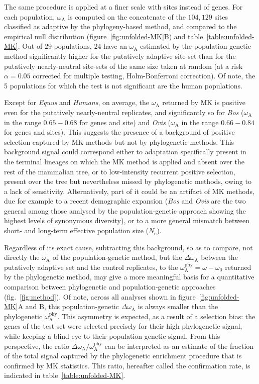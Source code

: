 \documentclass{article}
\newcommand{\Ne}{N_{\mathrm{e}}}
\newcommand{\rateApop}{\omega_{\mathrm{A}}}
\newcommand{\rateAphy}{\rateApop^{\mathrm{phy}}}
\begin{document}
    The same procedure is applied at a finer scale with sites instead of genes.
    For each population, $\rateApop$ is computed on the concatenate of the $104,129$ sites classified as adaptive by the phylogeny-based method, and compared to the empirical null distribution (figure~\ref{fig:unfolded-MK}B) and table~\ref{table:unfolded-MK}.
    Out of $29$ populations, $24$ have an $\rateApop$ estimated by the population-genetic method significantly higher for the putatively adaptive site-set than for the putatively nearly-neutral site-sets of the same size taken at random (at a risk $\alpha=0.05$ corrected for multiple testing, Holm-Bonferroni correction).
    Of note, the 5 populations for which the test is not significant are the human populations.

    Except for \textit{Equus} and \textit{Humans}, on average, the $\rateApop$ returned by MK is positive even for the putatively nearly-neutral replicates, and significantly so for \textit{Bos} ($\rateApop$ in the range $0.65-0.68$ for genes and site) and \textit{Ovis} ($\rateApop$ in the range $0.66-0.84$ for genes and sites).
    This suggests the presence of a background of positive selection captured by MK methods but not by phylogenetic methods.
    This background signal could correspond either to adaptation specifically present in the terminal lineages on which the MK method is applied and absent over the rest of the mammalian tree, or to low-intensity recurrent positive selection, present over the tree but nevertheless missed by phylogenetic methods, owing to a lack of sensitivity.
    Alternatively, part of it could be an artifact of MK methods, due for example to a recent demographic expansion (\textit{Bos} and \textit{Ovis} are the two general among those analysed by the population-genetic approach showing the highest levels of synonymous diversity), or to a more general mismatch between short- and long-term effective population size ($\Ne$)\cite{rousselle_overestimation_2018}.

    Regardless of its exact cause, subtracting this background, so as to compare, not directly the $\rateApop$ of the population-genetic method, but the $\Delta \rateApop$ between the putatively adaptive set and the control replicates, to the $\rateAphy= \omega - \omega_0$ returned by the phylogenetic method, may give a more meaningful basis for a quantitative comparison between phylogenetic and population-genetic approaches (fig.~\ref{fig:method}).
    Of note, across all analyses shown in figure~\ref{fig:unfolded-MK}A and B, this population-genetic $\Delta \rateApop$ is always smaller than the phylogenetic $\rateAphy$.
    This asymmetry is expected, as a result of a selection bias: the genes of the test set were selected precisely for their high phylogenetic signal, while keeping a blind eye to their population-genetic signal.
    From this perspective, the ratio $\Delta \rateApop /  \rateAphy$ can be interpreted as an estimate of the fraction of the total signal captured by the phylogenetic enrichment procedure that is confirmed by MK statistics.
    This ratio, hereafter called the confirmation rate, is indicated in table~\ref{table:unfolded-MK}.
\end{document}
